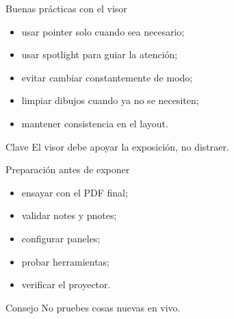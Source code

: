 \documentclass[aspectratio=169,professionalfonts]{beamer}
\begin{document}
\begin{frame}{Buenas prácticas con el visor}
\begin{itemize}
  \item usar pointer solo cuando sea necesario;
  \item usar spotlight para guiar la atención;
  \item evitar cambiar constantemente de modo;
  \item limpiar dibujos cuando ya no se necesiten;
  \item mantener consistencia en el layout.
\end{itemize}

\begin{alertblock}{Clave}
El visor debe apoyar la exposición, no distraer.
\end{alertblock}

\end{frame}

\begin{frame}{Preparación antes de exponer}
\begin{itemize}
  \item ensayar con el PDF final;
  \item validar notes y pnotes;
  \item configurar paneles;
  \item probar herramientas;
  \item verificar el proyector.
\end{itemize}

\begin{exampleblock}{Consejo}
No pruebes cosas nuevas en vivo.
\end{exampleblock}

\end{frame}
\end{document}
